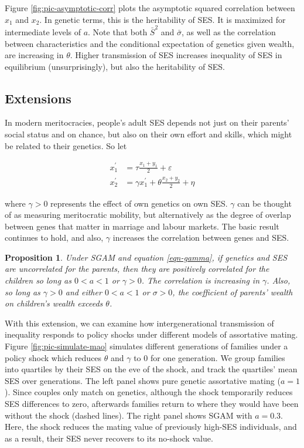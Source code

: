 \documentclass[
  12pt,
]{article}
\newtheorem{proposition}{Proposition}
\theoremstyle{definition}
\theoremstyle{definition}
\theoremstyle{definition}
\theoremstyle{definition}
\theoremstyle{remark}
\begin{document}
Figure \ref{fig:pic-asymptotic-corr} plots the asymptotic squared correlation
between \(x_1\) and \(x_2\). In genetic terms, this is the heritability of SES. It is
maximized for intermediate levels of \(a\). Note that both \(\bar{S}^{2}\) and
\(\bar{\sigma}\), as well as the correlation between characteristics and the
conditional expectation of genetics given wealth, are increasing in \(\theta\).
Higher transmission of SES increases inequality of SES in equilibrium
(unsurprisingly), but also the heritability of SES.

\subsection{Extensions}\label{extensions}

In modern meritocracies, people's adult SES depends not just
on their parents' social status and on chance, but also on their own effort and
skills, which might be related to their genetics. So let

\begin{align}
x^\prime_1 &= \tau \frac{x_{1} + y_{1}}{2} + \varepsilon   \nonumber \\
x^\prime_2 &= \gamma x^\prime_1 + \theta \frac{x_{2}+y_{2}}{2}+\eta \label{eqn-gamma}
\end{align}

where \(\gamma > 0\) represents the effect of own genetics on own SES. \(\gamma\)
can be thought of as measuring meritocratic mobility, but alternatively as the
degree of overlap between genes that matter in marriage and labour
markets. The basic result continues to hold, and also, \(\gamma\)
increases the correlation between genes and SES.

\begin{proposition}\label{prop-gamma}
Under SGAM and equation \eqref{eqn-gamma}, if genetics and SES are 
uncorrelated for the parents, then they
are positively correlated for the children so long as $0 < a < 1$ or
$\gamma > 0$. The correlation is increasing in $\gamma$. Also, so 
long as $\gamma > 0$ and either $0 < a < 1$ or $\sigma > 0$, the coefficient 
of parents' wealth on children's wealth exceeds $\theta$.
\end{proposition}

With this extension, we can examine how intergenerational transmission
of inequality responds to policy shocks under different models of assortative
mating. Figure \ref{fig:pic-simulate-mao} simulates different generations of
families under a policy shock which reduces \(\theta\) and \(\gamma\) to 0 for
one generation. We group families into quartiles by their SES on the eve of the
shock, and track the quartiles' mean SES over generations. The left panel shows
pure genetic assortative mating (\(a = 1\)). Since couples only match on genetics,
although the shock temporarily reduces SES differences to zero, afterwards
families return to where they would have been without the shock
(dashed lines). The right panel shows SGAM with \(a = 0.3\). Here, the shock
reduces the mating value of previously high-SES individuals, and as a result,
their SES never recovers to its no-shock value.
\end{document}
